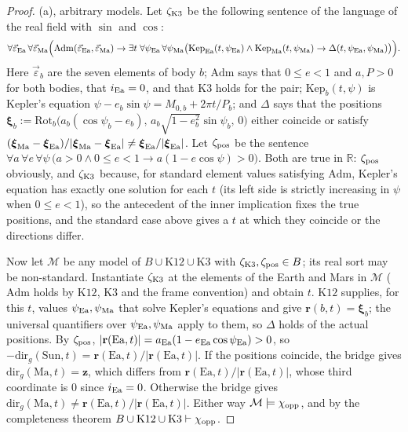 \begin{proof}
(a), arbitrary models. Let $\zeta_{\rm K3}$ be the following sentence of the language of the real field with $\sin$ and $\cos$:
\[
\forall\vec\varepsilon_{\rm Ea}\,\forall\vec\varepsilon_{\rm Ma}\Big(\mathrm{Adm}(\vec\varepsilon_{\rm Ea},\vec\varepsilon_{\rm Ma})\to\exists t\;\forall\psi_{\rm Ea}\,\forall\psi_{\rm Ma}\big(\mathrm{Kep}_{\rm Ea}(t,\psi_{\rm Ea})\wedge\mathrm{Kep}_{\rm Ma}(t,\psi_{\rm Ma})\to\Delta(t,\psi_{\rm Ea},\psi_{\rm Ma})\big)\Big).
\]
Here $\vec\varepsilon_b$ are the seven elements of body $b$; $\mathrm{Adm}$ says that $0\le e<1$ and $a,P>0$ for both bodies, that $i_{\rm Ea}=0$, and that $\mathrm{K3}$ holds for the pair; $\mathrm{Kep}_b(t,\psi)$ is Kepler's equation $\psi-e_b\sin\psi=M_{0,b}+2\pi t/P_b$; and $\Delta$ says that the positions $\boldsymbol\xi_b:=\mathrm{Rot}_b\big(a_b(\cos\psi_b-e_b),\,a_b\sqrt{1-e_b^2}\sin\psi_b,\,0\big)$ either coincide or satisfy $(\boldsymbol\xi_{\rm Ma}-\boldsymbol\xi_{\rm Ea})/\lvert\boldsymbol\xi_{\rm Ma}-\boldsymbol\xi_{\rm Ea}\rvert\ne\boldsymbol\xi_{\rm Ea}/\lvert\boldsymbol\xi_{\rm Ea}\rvert$. Let $\zeta_{\rm pos}$ be the sentence $\forall a\,\forall e\,\forall\psi\,\big(a>0\wedge0\le e<1\to a(1-e\cos\psi)>0\big)$. Both are true in $\mathbb R$: $\zeta_{\rm pos}$ obviously, and $\zeta_{\rm K3}$ because, for standard element values satisfying $\mathrm{Adm}$, Kepler's equation has exactly one solution for each $t$ (its left side is strictly increasing in $\psi$ when $0\le e<1$), so the antecedent of the inner implication fixes the true positions, and the standard case above gives a $t$ at which they coincide or the directions differ.

Now let $\mathcal M$ be any model of $B\cup\mathrm{K12}\cup\mathrm{K3}$ with $\zeta_{\rm K3},\zeta_{\rm pos}\in B$; its real sort may be non-standard. Instantiate $\zeta_{\rm K3}$ at the elements of the Earth and Mars in $\mathcal M$ ($\mathrm{Adm}$ holds by $\mathrm{K12}$, $\mathrm{K3}$ and the frame convention) and obtain $t$. $\mathrm{K12}$ supplies, for this $t$, values $\psi_{\rm Ea},\psi_{\rm Ma}$ that solve Kepler's equations and give $\mathbf r(b,t)=\boldsymbol\xi_b$; the universal quantifiers over $\psi_{\rm Ea},\psi_{\rm Ma}$ apply to them, so $\Delta$ holds of the actual positions. By $\zeta_{\rm pos}$, $\lvert\mathbf r(\mathrm{Ea},t)\rvert=a_{\rm Ea}(1-e_{\rm Ea}\cos\psi_{\rm Ea})>0$, so $-\mathrm{dir}_g(\mathrm{Sun},t)=\mathbf r(\mathrm{Ea},t)/\lvert\mathbf r(\mathrm{Ea},t)\rvert$. If the positions coincide, the bridge gives $\mathrm{dir}_g(\mathrm{Ma},t)=\mathbf z$, which differs from $\mathbf r(\mathrm{Ea},t)/\lvert\mathbf r(\mathrm{Ea},t)\rvert$, whose third coordinate is $0$ since $i_{\rm Ea}=0$. Otherwise the bridge gives $\mathrm{dir}_g(\mathrm{Ma},t)\ne\mathbf r(\mathrm{Ea},t)/\lvert\mathbf r(\mathrm{Ea},t)\rvert$. Either way $\mathcal M\models\chi_{\rm opp}$, and by the completeness theorem $B\cup\mathrm{K12}\cup\mathrm{K3}\vdash\chi_{\rm opp}$.
\end{proof}

